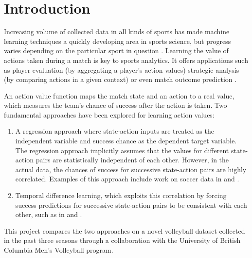 \documentclass{sfuthesis}
\begin{document}
	\mainmatter%
	
	
	\chapter{Introduction}
	
	Increasing volume of collected data in all kinds of sports has made machine learning techniques a quickly developing area in sports science, but progress varies depending on the particular sport in question \cite{claudino2019current}. Learning the value of actions taken during a match is key to sports analytics. It offers applications such as player evaluation (by aggregating a player's action values) strategic analysis (by comparing actions in a given context) or even match outcome prediction \cite{albert2017handbook, liu2018deep, pappalardo2018quantifying, pettigrew2015assessing, schulte2017markov}.
	
	An action value function maps the match state and an action to a real value, which measures the team's chance of success after the action is taken. Two fundamental approaches have been explored for learning action values:
	\begin{enumerate}
		\item A regression approach where state-action inputs are treated as the independent variable and success chance as the dependent target variable. The regression approach implicitly assumes that the values for different state-action pairs are statistically independent of each other. However, in the actual data, the chances of success for successive state-action pairs are highly correlated. Examples of this approach include work on soccer data in \cite{decroos2019actions} and \cite{pappalardo2019playerank}.
		\item Temporal difference learning, which exploits this correlation by forcing success predictions for successive state-action pairs to be consistent with each other, such as in \cite{liu2018deep} and \cite{schulte2017markov}.
	\end{enumerate}
	This project compares the two approaches on a novel volleyball dataset collected in the past three seasons through a collaboration with the University of British Columbia Men's Volleyball program.
	
\end{document}
